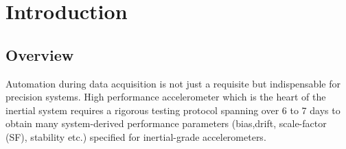 \documentclass{FR16}
\begin{document}
\maketitle

\tableofcontents
\newpage

\section{Introduction}

\subsection{Overview}
Automation during data acquisition is not just a requisite but indispensable for precision systems. High performance accelerometer which is the heart of the inertial system requires a rigorous testing protocol spanning over 6 to 7 days  to obtain many system-derived performance parameters (bias,drift, scale-factor (SF),  stability etc.) specified for inertial-grade accelerometers. 

\end{document}
